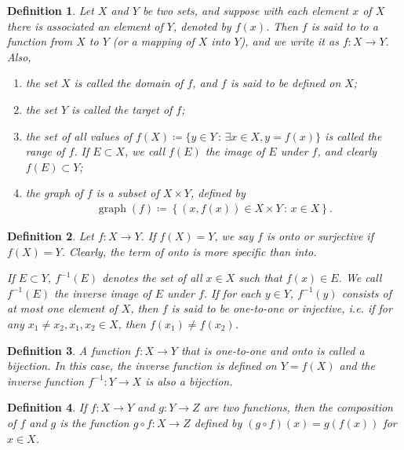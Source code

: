 \documentclass[11pt]{book}
\newtheorem{definition}{Definition}[chapter]
\theoremstyle{definition}
\numberwithin{equation}{chapter}
\begin{document}
\begin{definition}
Let $X$ and $Y$ be two sets, and suppose with each element $x$ of $X$ there is associated an element of $Y$, denoted by $f(x)$. Then $f$ is said to to a function from $X$ to $Y$ (or a mapping of $X$ into $Y$), and we write it as $f: X \to Y$. Also,
\begin{enumerate}[label=(\alph*)]
    \item the set $X$ is called the domain of $f$, and $f$ is said to be defined on $X$;
    
    \item the set $Y$ is called the target of $f$;
    
    \item the set of all values of $f(X) \coloneqq \{y \in Y \,:\, \exists x \in X, y = f(x)\}$ is called the range of $f$. If $E \subset X$, we call $f(E)$ the image of $E$ under $f$, and clearly $f(E) \subset Y$;
    
    \item the graph of $f$ is a subset of $X \times Y$, defined by
    \begin{align*}
        \operatorname{graph}(f) \coloneqq \left\{(x,f(x)) \in X \times Y \,:\, x \in X \right\}.
    \end{align*}
\end{enumerate}
\end{definition}

\medskip

\begin{definition}
Let $f: X \to Y$. If $f(X) = Y$, we say $f$ is onto or surjective if $f(X) = Y$. Clearly, the term of onto is more specific than into.

If $E \subset Y$, $f^{-1}(E)$ denotes the set of all $x \in X$ such that $f(x) \in E$. We call $f^{-1}(E)$ the inverse image of $E$ under $f$. If for each $y \in Y$, $f^{-1}(y)$ consists of at most one element of $X$, then $f$ is said to be one-to-one or injective, i.e. if for any $x_1 \neq x_2, x_1, x_2 \in X$, then $f(x_1) \neq f(x_2)$.
\end{definition}

\medskip

\begin{definition}
A function $f:X \to Y$ that is one-to-one and onto is called a bijection. In this case, the inverse function is defined on $Y = f(X)$ and the inverse function $f^{-1}: Y \to X$ is also a bijection.
\end{definition}

\begin{definition}
If $f: X \to Y$ and $g: Y \to Z$ are two functions, then the composition of $f$ and $g$ is the function $g \circ f: X \to Z$ defined by $(g \circ f)(x) = g(f(x))$ for $x \in X$.
\end{definition}
\end{document}
